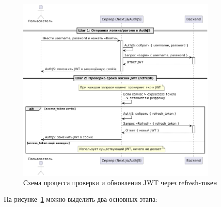\begin{figure}[H]
    \centering
    \includegraphics[width=0.9\textwidth]{static/diagrams/AuthRefresh.png}
    \caption{Схема процесса проверки и обновления JWT через refresh-токен}
    \label{fig:auth-refresh}
\end{figure}

На рисунке~\ref{fig:auth-refresh} можно выделить два основных этапа:

